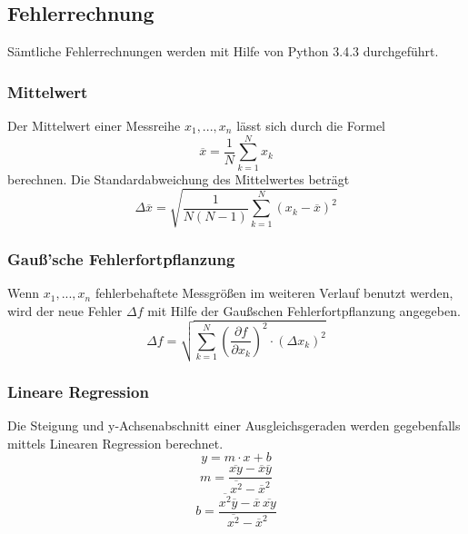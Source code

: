 \subsection{Fehlerrechnung}
\label{sec:Fehler}
Sämtliche Fehlerrechnungen werden mit Hilfe von Python 3.4.3 durchgeführt.
\subsubsection{Mittelwert}
Der Mittelwert einer Messreihe $x_1, ... ,x_n$ lässt sich durch die Formel
\begin{equation}
        \overline{x} = \frac{1}{N} \sum_{k=1}^N x_k
\end{equation}
berechnen. Die Standardabweichung des Mittelwertes beträgt
\begin{equation}
        \Delta \overline{x} = \sqrt{ \frac{1}{N(N-1)} \sum_{k=1}^N (x_k - \overline{x})^2}
\end{equation}

\subsubsection{Gauß'sche Fehlerfortpflanzung}
Wenn $x_1, ..., x_n$ fehlerbehaftete Messgrößen im weiteren Verlauf benutzt werden, wird der neue Fehler $\Delta f$ mit Hilfe der Gaußschen Fehlerfortpflanzung angegeben.
\begin{equation}
        \label{eqn:Gauß}
	\Delta f = \sqrt{\sum_{k=1}^N \left( \frac{ \partial f}{\partial x_k} \right) ^2 \cdot (\Delta x_k)^2}
\end{equation}

\subsubsection{Lineare Regression}
Die Steigung und y-Achsenabschnitt einer Ausgleichsgeraden werden gegebenfalls mittels Linearen Regression berechnet.
\begin{equation}
        y = m \cdot x + b
\end{equation}
\begin{equation}
	\label{eqn:m}
        m = \frac{ \overline{xy} - \overline{x} \overline{y} } {\overline{x^2} - \overline{x}^2}
\end{equation}
\begin{equation}
	\label{eqn:b}
        b = \frac{ \overline{x^2}\overline{y} - \overline{x} \, \overline{xy}} { \overline{x^2} - \overline{x}^2}
\end{equation}


